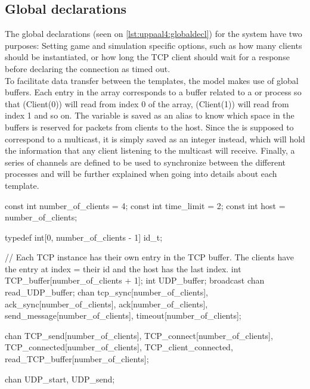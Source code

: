 \subsection*{Global declarations}
The global declarations (seen on \autoref{lst:uppaal4:globaldecl}) for the system have two purposes: Setting game and simulation specific options, such as how many clients should be instantiated, or how long the TCP client should wait for a response before declaring the connection as timed out.
\\
To facilitate data transfer between the templates, the model makes use of global buffers.
Each entry in the  array corresponds to a buffer related to a  or  process so that \uppProc(Client(0)) will read from index 0 of the array, \uppProc(Client(1)) will read from index 1 and so on.
The  variable is saved as an alias to know which space in the buffers is reserved for packets from clients to the host.
Since the  is supposed to correspond to a multicast, it is simply saved as an integer instead, which will hold the information that any client listening to the multicast will receive.
Finally, a series of channels are defined to be used to synchronize between the different processes and will be further explained when going into details about each template.

\begin{uppaalcode}[caption={Global declarations}, label={lst:uppaal4:globaldecl},captionpos=b]
const int number_of_clients = 4;
const int time_limit = 2;
const int host = number_of_clients;

typedef int[0, number_of_clients - 1] id_t;

// Each TCP instance has their own entry in the TCP buffer. The clients have the entry at index = their id and the host has the last index.
int TCP_buffer[number_of_clients + 1];
int UDP_buffer;
broadcast chan read_UDP_buffer;
chan tcp_sync[number_of_clients], ack_sync[number_of_clients], ack[number_of_clients], send_message[number_of_clients], timeout[number_of_clients];

chan TCP_send[number_of_clients], TCP_connect[number_of_clients], TCP_connected[number_of_clients], TCP_client_connected, read_TCP_buffer[number_of_clients];

chan UDP_start, UDP_send;
\end{uppaalcode}


